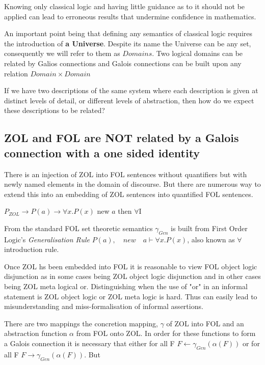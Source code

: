 Knowing only classical logic and having little guidance as to it should not be applied can lead to erroneous results that undermine confidence in mathematics.


 An important point being that defining any semantics of classical logic requires the introduction of {\bf a Universe}.  Despite its name the Universe can be any set, consequently we will refer to them as $Domains$.   Two logical domains can be related by Galios connections and Galois connections can be built upon any relation $Domain\times Domain$

If we have two descriptions of  the same system where each description is given at distinct levels of detail, or different levels of abstraction,  then how do we expect these descriptions to be related?


\subsection{ZOL and  FOL are NOT related by a Galois connection with a one sided identity}
  There is an  injection of ZOL into FOL sentences without quantifiers but with newly named elements in the domain of discourse. But there are numerous way to extend this into an embedding of ZOL sentences into quantified FOL sentences. 
   
  \hspace{\fill} $P_{ZOL} \rightarrow P(a) \rightarrow \forall x. P(x)$ \hspace{\fill}new  $a$ then $\forall$I
  
   From the standard  FOL set theoretic semantics $\gamma_{Gen}$ is built from First Order Logic's \emph{Generalisation Rule} $P(a), \quad new \quad a\vdash \forall x. P(x)$, also known as $\forall$ introduction rule.
  
Once ZOL hs been embedded into FOL it is reasonable to view FOL object logic disjunction as in some cases being ZOL object logic disjunction and in other cases being ZOL meta logical or. Distinguishing  when the use of "or" in an informal statement is ZOL object logic or ZOL meta logic is hard. Thus  can easily lead to misunderstanding and miss-formalisation of informal assertions.
  
 
  
 There are two mappings the concretion mapping, $\gamma$  of ZOL into FOL and an abstraction function $\alpha$ from FOL onto ZOL. In order for these  functions to form a Galois connection  it is necessary that either for all F $F \leftarrow \gamma_{Gen}(\alpha(F))$ or for all F $ F\rightarrow \gamma_{Gen}(\alpha(F)) $. But
  
